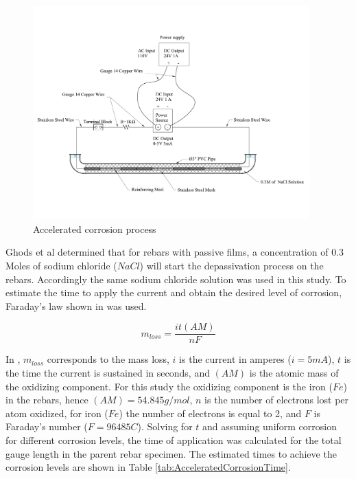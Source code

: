 \begin{figure}[htbp]
	\centering
	\includegraphics[width=0.95\textwidth]{VAC Prelim 2.0/Chapter-3/figs/AcceleratedCorrosionProcedure.pdf}
	\caption{Accelerated corrosion process}
	\label{fig:AcceleratedCorrosion}
\end{figure}

Ghods et al \cite{Ghods2010} determined that for rebars with passive films, a concentration of 0.3 Moles of sodium chloride ($NaCl$) will start the depassivation process on the rebars. Accordingly the same sodium chloride solution was used in this study. To estimate the time to apply the current and obtain the desired level of corrosion, Faraday's law shown in  was used.

\begin{equation}
	m_{loss}=\frac{it(AM)}{nF}
	\label{eq.FaradayEq}
\end{equation}

 In , $m_{loss}$ corresponds to the mass loss, $i$ is the current in amperes ($i=5 mA$), $t$ is the time the current is sustained in seconds, and $(AM)$ is the atomic mass of the oxidizing component. For this study the oxidizing component is the iron ($Fe$) in the rebars, hence $(AM)=54.845g/mol$, $n$ is the number of electrons lost per atom oxidized, for iron ($Fe$) the number of electrons is equal to 2, and $F$ is Faraday's number ($F=96485 C$). Solving  for $t$ and assuming uniform corrosion for different corrosion levels, the time of application was calculated for the total gauge length in the parent rebar specimen. The estimated times to achieve the corrosion levels are shown in Table \ref{tab:AcceleratedCorrosionTime}. 

